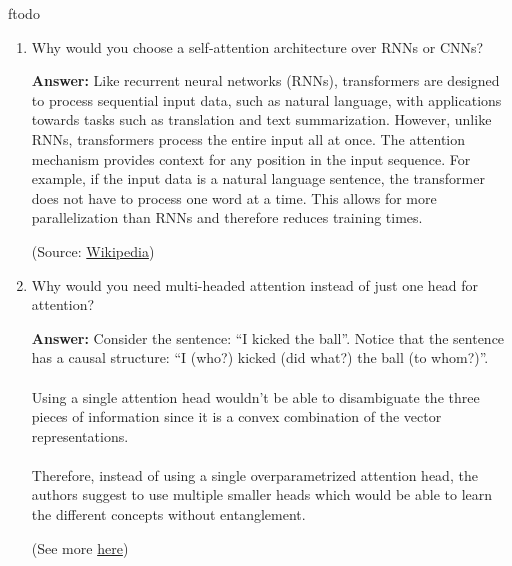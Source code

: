 ƒtodo\documentclass{article}
\newenvironment{QandA}{\begin{enumerate}[label=\arabic*.]}{\end{enumerate}}
\newenvironment{InnerQandA}{\begin{enumerate}[label=\roman*.]}{\end{enumerate}}
\newenvironment{answer}{\par\normalfont \textbf{Answer:}}{}
\begin{document}
\begin{QandA}
\begin{InnerQandA}
\begin{answer}
            (Source: \href{https://jalammar.github.io/illustrated-transformer/}{Jay Alammar's blog})
        \end{answer}

        \item Why would you choose a self-attention architecture over RNNs or CNNs?
        \begin{answer}
            Like recurrent neural networks (RNNs), transformers are designed to process sequential input data, such as natural language, with applications towards tasks such as translation and text summarization. However, unlike RNNs, transformers process the entire input all at once. The attention mechanism provides context for any position in the input sequence. For example, if the input data is a natural language sentence, the transformer does not have to process one word at a time. This allows for more parallelization than RNNs and therefore reduces training times.

            (Source: \href{https://en.wikipedia.org/wiki/Transformer\_(machine\_learning\_model)}{Wikipedia})
        \end{answer}

        \item Why would you need multi-headed attention instead of just one head for attention?
        \begin{answer}
            Consider the sentence: ``I kicked the ball''. Notice that the sentence has a causal structure: ``I (who?) kicked (did what?) the ball (to whom?)''. \\\\
            Using a single attention head wouldn't be able to disambiguate the three pieces of information since it is a convex combination of the vector representations. \\\\
            Therefore, instead of using a single overparametrized attention head, the authors suggest to use multiple smaller heads which would be able to learn the different concepts without entanglement. 

            (See more \href{https://www.youtube.com/watch?v=5vcj8kSwBCY}{here})
        \end{answer}


\end{InnerQandA}
\end{QandA}
\end{document}
